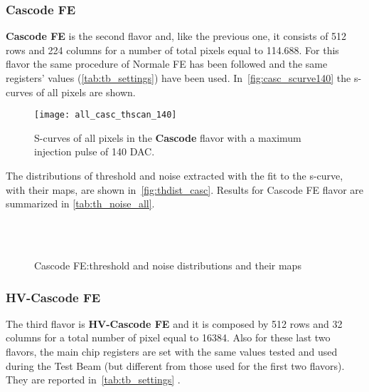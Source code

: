 \subsubsection{Cascode FE}

\textbf{Cascode FE} is the second flavor and, like the previous one, it consists of 512 rows and 224 columns for a number of total pixels equal to 114.688. For this flavor the same procedure of Normale FE has been followed and the same registers' values (\autoref{tab:tb_settings}) have been used.
In~\autoref{fig:casc_scurve140} the s-curves of all pixels are shown.

\begin{figure}[h!]
\centering
\texttt{[image: all\_casc\_thscan\_140]}
\caption{S-curves of all pixels in the \textbf{Cascode} flavor with a maximum injection pulse of 140 DAC.}
\label{fig:casc_scurve140}
\end{figure}

The distributions of threshold and noise extracted with the fit to the s-curve, with their maps, are shown in~\autoref{fig:thdist_casc}. Results for Cascode FE flavor are summarized in \autoref{tab:th_noise_all}.


\begin{figure}[h!]
\centering
{}\quad
{}\\
\quad
{}\\
\caption{Cascode FE:threshold and noise distributions and their maps}
\label{fig:thdist_casc}
\end{figure}



\subsubsection{HV-Cascode FE}


The third flavor is \textbf{HV-Cascode FE} and it is composed by 512 rows and 32 columns for a total number of pixel equal to 16384. Also for these last two flavors, the main chip registers are set with the same values tested and used during the Test Beam (but different from those used for the first two flavors). They are reported in~\autoref{tab:tb_settings} .

